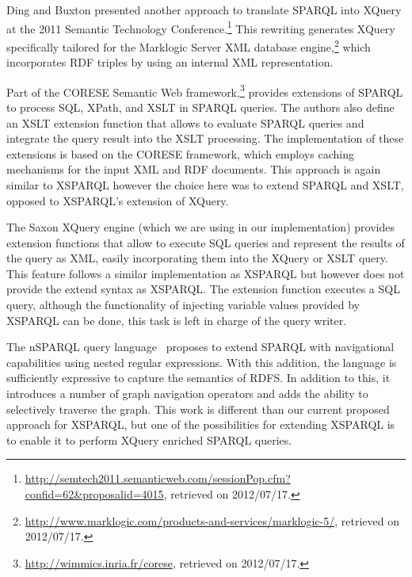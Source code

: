 Ding and Buxton presented another approach to translate SPARQL into XQuery at the 2011 Semantic Technology
Conference.\footnote{\url{http://semtech2011.semanticweb.com/sessionPop.cfm?confid=62&proposalid=4015}, retrieved on
  2012/07/17.} 
%
This rewriting generates XQuery specifically tailored for the Marklogic Server \ac{XML} database
engine,\footnote{\url{http://www.marklogic.com/products-and-services/marklogic-5/}, retrieved on 2012/07/17.} which
incorporates \ac{RDF} triples by using an internal \ac{XML} representation.


Part of the CORESE Semantic Web framework,\footnote{\url{http://wimmics.inria.fr/corese}, retrieved on 2012/07/17.}
\citet{CorbyKefi-KhelifCherfi:2009aa} provides extensions of SPARQL to process SQL, XPath, and \ac{XSLT} in SPARQL queries.  
%
The authors also define an \ac{XSLT} extension function that allows to evaluate SPARQL queries and integrate the query
result into the \ac{XSLT} processing.
%
The implementation of these extensions is based on the CORESE framework, which employs caching mechanisms for the input
\ac{XML} and \ac{RDF} documents.
%
This approach is again similar to XSPARQL however the choice here was to extend SPARQL and \ac{XSLT}, opposed to XSPARQL's extension
of XQuery.  


The Saxon XQuery engine (which we are using in our implementation) provides extension functions that allow to execute
\ac{SQL} queries and represent the results of the query as \ac{XML}, easily incorporating them into the XQuery or
\ac{XSLT} query.
%
This feature follows a similar implementation as XSPARQL but however does not provide the extend syntax as XSPARQL.  The
extension function executes a \ac{SQL} query, although the functionality of injecting variable values provided by
XSPARQL can be done, this task is left in charge of the query writer.

The nSPARQL query language~\cite{PerezArenasGutierrez:2008aa} proposes to extend SPARQL with navigational capabilities
using nested regular expressions.  With this addition, the language is sufficiently expressive to capture the semantics
of \ac{RDFS}.  In addition to this, it introduces a number of graph navigation operators and adds the ability to selectively
traverse the graph.  This work is different than our current proposed approach for XSPARQL, but one of the possibilities
for extending XSPARQL is to enable it to perform XQuery enriched SPARQL queries.



